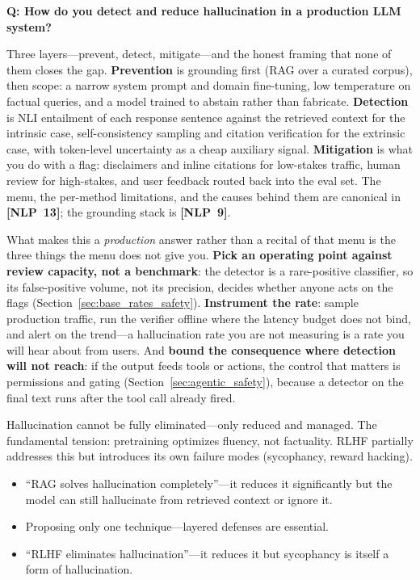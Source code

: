 \begin{interviewq}
\textbf{Q: How do you detect and reduce hallucination in a production LLM system?}

 \quad {} \quad \badgefreq{\freqhigh}

\stronganswer

Three layers---prevent, detect, mitigate---and the honest framing that none of
them closes the gap. \textbf{Prevention} is grounding first (RAG over a curated
corpus), then scope: a narrow system prompt and domain fine-tuning, low
temperature on factual queries, and a model trained to abstain rather than
fabricate. \textbf{Detection} is NLI entailment of each response sentence
against the retrieved context for the intrinsic case, self-consistency sampling
and citation verification for the extrinsic case, with token-level uncertainty
as a cheap auxiliary signal. \textbf{Mitigation} is what you do with a flag:
disclaimers and inline citations for low-stakes traffic, human review for
high-stakes, and user feedback routed back into the eval set. The menu, the
per-method limitations, and the causes behind them are canonical in
\textbf{[NLP~13]}; the grounding stack is \textbf{[NLP~9]}.

What makes this a \emph{production} answer rather than a recital of that menu is
the three things the menu does not give you. \textbf{Pick an operating point
against review capacity, not a benchmark}: the detector is a rare-positive
classifier, so its false-positive volume, not its precision, decides whether
anyone acts on the flags (Section~\ref{sec:base_rates_safety}).
\textbf{Instrument the rate}: sample production traffic, run the verifier
offline where the latency budget does not bind, and alert on the trend---a
hallucination rate you are not measuring is a rate you will hear about from
users. And \textbf{bound the consequence where detection will not reach}: if the
output feeds tools or actions, the control that matters is permissions and
gating (Section~\ref{sec:agentic_safety}), because a detector on the final text
runs after the tool call already fired.

Hallucination cannot be fully eliminated---only reduced and managed. The fundamental tension: pretraining optimizes fluency, not factuality. RLHF partially addresses this but introduces its own failure modes (sycophancy, reward hacking).

\redflags
\begin{itemize}
    \item ``RAG solves hallucination completely''---it reduces it significantly but the model can still hallucinate from retrieved context or ignore it.
    \item Proposing only one technique---layered defenses are essential.
    \item ``RLHF eliminates hallucination''---it reduces it but sycophancy is itself a form of hallucination.
\end{itemize}


\end{interviewq}
